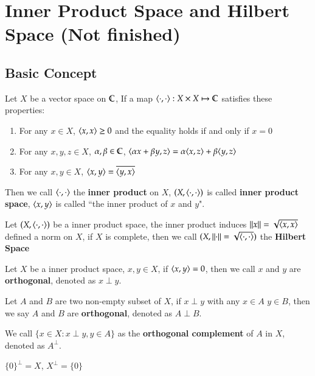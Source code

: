 \section{Inner Product Space and Hilbert Space (Not finished)}

\subsection{Basic Concept}

\begin{definition}\label{def:3.1}
    Let $X$ be a vector space on $\mathbb{C}$, If a map $\langle\cdot, \cdot\rangle: X \times X \mapsto \mathbb{C}$ satisfies these properties:
    \begin{enumerate}[itemsep=0pt, topsep=0pt]
        \item For any $x \in X$, $\langle x, x\rangle \geq 0$ and the equality holds if and only if $x = 0$
        \item For any $x, y, z \in X$, $\alpha, \beta \in \mathbb{C}$, $\langle\alpha x + \beta y, z\rangle = \alpha \langle x, z\rangle + \beta\langle y, z\rangle$
        \item For any $x, y \in X$, $\langle x, y\rangle = \overline{\langle y, x\rangle}$ 
    \end{enumerate}
    Then we call $\langle\cdot, \cdot\rangle$ the \textbf{inner product} on $X$, $(X, \langle\cdot, \cdot\rangle)$ is called \textbf{inner product space}, $\langle x, y\rangle$ is called ``the inner product of $x$ and $y$".
\end{definition}

\begin{definition}\label{def:3.2}
    Let $(X, \langle\cdot, \cdot\rangle)$ be a inner product space, the inner product induces $\Norm{x} = \sqrt{\spns{x, x}}$ defined a norm on $X$, if $X$ is complete, then we call $(X, \Norm{\cdot} = \sqrt{\spns{\cdot, \cdot}})$ the \textbf{Hilbert Space}
\end{definition}

\begin{definition}\label{def:3.3}
    Let $X$ be a inner product space, $x, y \in X$, if $\langle x, y\rangle = 0$, then we call $x$ and $y$ are \textbf{orthogonal}, denoted as $x \perp y$.
    
    Let $A$ and $B$ are two non-empty subset of $X$, if $x \perp y$ with any $x \in A$ $y \in B$, then we say $A$ and $B$ are \textbf{orthogonal}, denoted as $A \perp B$.
    
    We call $\{x \in X: x\perp y, y \in A\}$ as the \textbf{orthogonal complement} of $A$ in $X$, denoted as $A^{\perp}$.
\end{definition}
\begin{Remark}
$\{0\}^{\perp} = X$, $X^{\perp} = \{0\}$
\end{Remark}

